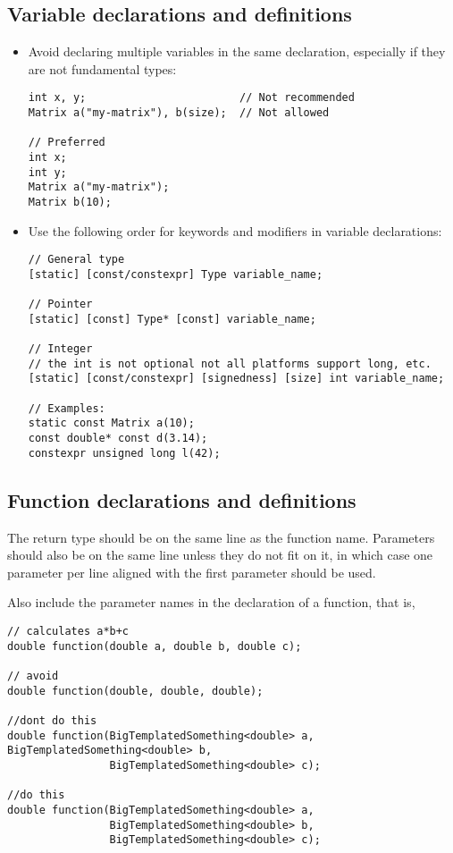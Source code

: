 \subsection{Variable declarations and definitions}
\begin{itemize}
\item Avoid declaring multiple variables in the same declaration, especially if they are not fundamental types:

\begin{lstlisting}[showspaces=false]
int x, y;                        // Not recommended
Matrix a("my-matrix"), b(size);  // Not allowed

// Preferred
int x;
int y;
Matrix a("my-matrix");
Matrix b(10);
\end{lstlisting}

\item Use the following order for keywords and modifiers in  variable declarations:

\begin{lstlisting}[showspaces=false]
// General type
[static] [const/constexpr] Type variable_name;

// Pointer
[static] [const] Type* [const] variable_name;

// Integer
// the int is not optional not all platforms support long, etc.
[static] [const/constexpr] [signedness] [size] int variable_name;

// Examples:
static const Matrix a(10);
const double* const d(3.14);
constexpr unsigned long l(42);
\end{lstlisting}

\end{itemize}

\subsection{Function declarations and definitions}

The return type should be on the same line as the function name.
Parameters should also be on the same line unless they do not fit on it, in which case one parameter
per line aligned with the first parameter should be used.

Also include the parameter names in the declaration of a function, that is,
\begin{lstlisting}
// calculates a*b+c
double function(double a, double b, double c);

// avoid
double function(double, double, double);

//dont do this
double function(BigTemplatedSomething<double> a, BigTemplatedSomething<double> b,
                BigTemplatedSomething<double> c);

//do this
double function(BigTemplatedSomething<double> a,
                BigTemplatedSomething<double> b,
                BigTemplatedSomething<double> c);

\end{lstlisting}


